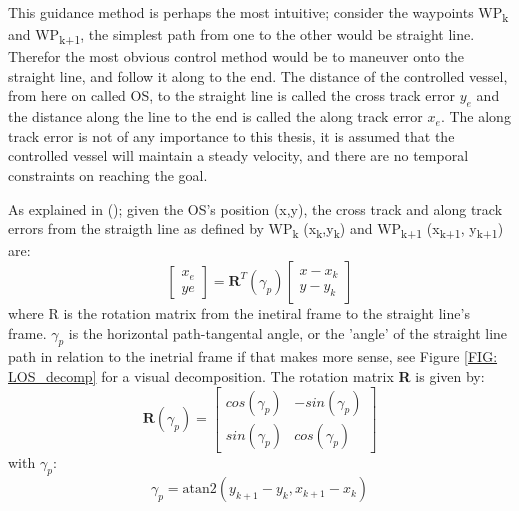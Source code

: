 This guidance method is perhaps the most intuitive; consider the waypoints WP\textsubscript{k} and WP\textsubscript{k+1}, the simplest path
from one to the other would be straight line. Therefor the most obvious control method would be to maneuver onto the straight line, and
follow it along to the end. The distance of the controlled vessel, from here on called \gls{OS}, to the straight line is called the cross track error $y_e$ and the distance along the line
to the end is called the along track error $x_e$. The along track error is not of any importance to this thesis, it is assumed that the controlled
vessel will maintain a steady velocity, and there are no temporal constraints on reaching the goal.

As explained in (\cite{lekkas2013line}); given the \gls{OS}'s position (x,y), the cross track and along track errors from the straigth line as defined by WP\textsubscript{k} (x\textsubscript{k},y\textsubscript{k})
and WP\textsubscript{k+1} (x\textsubscript{k+1}, y\textsubscript{k+1}) are:
\begin{equation}\label{EQ: cross and along track error} %
    \begin{bmatrix}
        x_e \\[-5pt]
         ye
    \end{bmatrix} = \textbf{R}^T(\gamma_p) \begin{bmatrix}
                                            x - x_k \\[-5pt]
                                            y - y_k
                                            \end{bmatrix}
\end{equation}
where R is the rotation matrix from the inetiral frame to the straight line's frame. $\gamma_p$ is the horizontal path-tangental angle,
or the 'angle' of the straight line path in relation to the inetrial frame if that makes more sense, see Figure \ref{FIG: LOS_decomp} for a visual
decomposition. The rotation matrix \textbf{R} is given by:
\begin{equation} %
    \textbf{R}(\gamma_p) = \begin{bmatrix}
                            cos(\gamma_p) & -sin(\gamma_p) \\[-5pt]
                            sin(\gamma_p) & cos(\gamma_p)
                            \end{bmatrix}
\end{equation}
with $\gamma_p$:
\begin{equation} %
    \gamma_p = \textrm{atan2}(y_{k+1} - y_k , x_{k+1} - x_k)
\end{equation}
